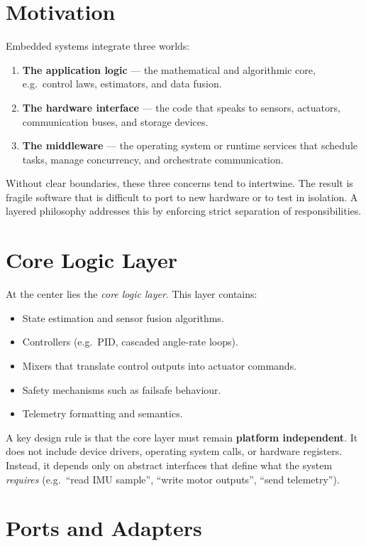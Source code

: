 \section{Motivation}

Embedded systems integrate three worlds:
\begin{enumerate}
    \item \textbf{The application logic} — the mathematical and algorithmic core, e.g.\ control laws, estimators, and data fusion.
    \item \textbf{The hardware interface} — the code that speaks to sensors, actuators, communication buses, and storage devices.
    \item \textbf{The middleware} — the operating system or runtime services that schedule tasks, manage concurrency, and orchestrate communication.
\end{enumerate}

Without clear boundaries, these three concerns tend to intertwine. 
The result is fragile software that is difficult to port to new hardware or to test in isolation. 
A layered philosophy addresses this by enforcing strict separation of responsibilities.

\section{Core Logic Layer}

At the center lies the \emph{core logic layer}. 
This layer contains:
\begin{itemize}
    \item State estimation and sensor fusion algorithms.
    \item Controllers (e.g.\ PID, cascaded angle-rate loops).
    \item Mixers that translate control outputs into actuator commands.
    \item Safety mechanisms such as failsafe behaviour.
    \item Telemetry formatting and semantics.
\end{itemize}

A key design rule is that the core layer must remain \textbf{platform independent}. 
It does not include device drivers, operating system calls, or hardware registers. 
Instead, it depends only on abstract interfaces that define what the system \emph{requires} (e.g.\ ``read IMU sample'', ``write motor outputs'', ``send telemetry'').

\section{Ports and Adapters}

